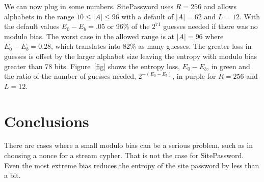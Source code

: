 \documentclass[11pt, oneside]{article}   	%
\begin{document}
We can now plug in some numbers.  SitePassword uses $R = 256$ and allows alphabets in the range $10 \leq |A| \leq 96$ with a default of $|A| = 62$ and $L = 12$.  With the default values $E_0 - E_b = .05$ or 96\% of the $2^{71}$ guesses needed if there was no modulo bias.  The worst case in the allowed range is at $|A| = 96$ where $E_0 - E_b = 0.28$, which translates into 82\% as many guesses.  The greater loss in guesses is offset by the larger alphabet size leaving the entropy with modulo bias greater than 78 bits.  Figure~\ref{fig} shows the entropy loss, $E_0 - E_b$, in green and the ratio of the number of guesses needed, $2^{-(E_0-E_b)}$, in purple for $R = 256$ and $L = 12$.

\section{Conclusions}

There are cases where a small modulo bias can be a serious problem, such as in choosing a nonce for a stream cypher.  That is not the case for SitePassword.  Even the most extreme bias reduces the entropy of the site password by less than a bit.
\end{document}
